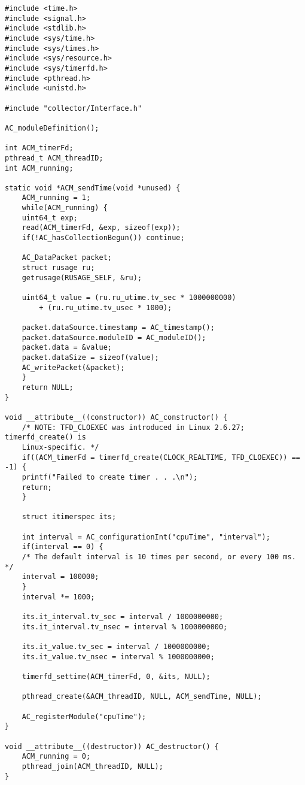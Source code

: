 \begin{lstlisting}
#include <time.h>
#include <signal.h>
#include <stdlib.h>
#include <sys/time.h>
#include <sys/times.h>
#include <sys/resource.h>
#include <sys/timerfd.h>
#include <pthread.h>
#include <unistd.h>

#include "collector/Interface.h"

AC_moduleDefinition();

int ACM_timerFd;
pthread_t ACM_threadID;
int ACM_running;

static void *ACM_sendTime(void *unused) {
    ACM_running = 1;
    while(ACM_running) {
	uint64_t exp;
	read(ACM_timerFd, &exp, sizeof(exp));
	if(!AC_hasCollectionBegun()) continue;
	
	AC_DataPacket packet;
	struct rusage ru;
	getrusage(RUSAGE_SELF, &ru);
	
	uint64_t value = (ru.ru_utime.tv_sec * 1000000000)
	    + (ru.ru_utime.tv_usec * 1000);
	
	packet.dataSource.timestamp = AC_timestamp();
	packet.dataSource.moduleID = AC_moduleID();
	packet.data = &value;
	packet.dataSize = sizeof(value);
	AC_writePacket(&packet);
    }
    return NULL;
}

void __attribute__((constructor)) AC_constructor() {
    /* NOTE: TFD_CLOEXEC was introduced in Linux 2.6.27; timerfd_create() is
	Linux-specific. */
    if((ACM_timerFd = timerfd_create(CLOCK_REALTIME, TFD_CLOEXEC)) == -1) {
	printf("Failed to create timer . . .\n");
	return;
    }
    
    struct itimerspec its;
    
    int interval = AC_configurationInt("cpuTime", "interval");
    if(interval == 0) {
	/* The default interval is 10 times per second, or every 100 ms. */
	interval = 100000;
    }
    interval *= 1000;
    
    its.it_interval.tv_sec = interval / 1000000000;
    its.it_interval.tv_nsec = interval % 1000000000;
    
    its.it_value.tv_sec = interval / 1000000000;
    its.it_value.tv_nsec = interval % 1000000000;
    
    timerfd_settime(ACM_timerFd, 0, &its, NULL);
    
    pthread_create(&ACM_threadID, NULL, ACM_sendTime, NULL);
    
    AC_registerModule("cpuTime");
}

void __attribute__((destructor)) AC_destructor() {
    ACM_running = 0;
    pthread_join(ACM_threadID, NULL);
}

\end{lstlisting}

